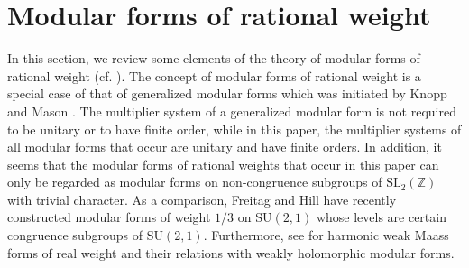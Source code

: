 \documentclass[12pt]{amsart}
\numberwithin{equation}{section}
\theoremstyle{plain}
\theoremstyle{definition}
\theoremstyle{remark}
\newcommand\slZ{\mathrm{SL}_2(\mathbb{Z})}
\begin{document}
\section{Modular forms of rational weight}
\label{sec:Modular forms of rational weight}
In this section, we review some elements of the theory of modular forms of rational weight (cf. \cite{Zhu23, Ibu20, Aok17, KM12, KM03, Ibu00, Pet38}). The concept of modular forms of rational weight is a special case of that of generalized modular forms which was initiated by Knopp and Mason \cite{KM03}. The multiplier system of a generalized modular form is not required to be unitary or to have finite order, while in this paper, the multiplier systems of all modular forms that occur are unitary and have finite orders. In addition, it seems that the modular forms of rational weights that occur in this paper can only be regarded as modular forms on non-congruence subgroups of $\slZ$ with trivial character. As a comparison, Freitag and Hill \cite{FH23} have recently constructed modular forms of weight $1/3$ on $\mathrm{SU}(2,1)$ whose levels are certain congruence subgroups of $\mathrm{SU}(2,1)$. Furthermore, see \cite[Section 2]{LL23} for harmonic weak Maass forms of real weight and their relations with weakly holomorphic modular forms.
\end{document}
